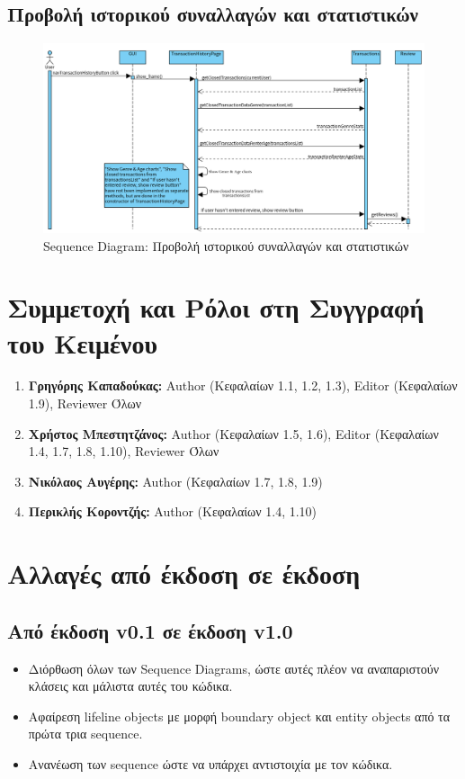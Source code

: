 \documentclass[12pt,a4paper]{article}
\begin{document}
\subsection{Προβολή ιστορικού συναλλαγών και στατιστικών}
\begin{figure}[H]
	\includegraphics[width=\textwidth]{History and Statistics Sequence.png}
	\caption{Sequence Diagram: Προβολή ιστορικού συναλλαγών και στατιστικών}
	\label{Sequence Diagram: Προβολή ιστορικού συναλλαγών και στατιστικών}
\end{figure}

\section{Συμμετοχή και Ρόλοι στη Συγγραφή του Κειμένου}
\begin{enumerate}
	\item \textbf{Γρηγόρης Καπαδούκας:} Author (Κεφαλαίων 1.1, 1.2, 1.3), Editor (Κεφαλαίων 1.9), Reviewer Όλων
	\item \textbf{Χρήστος Μπεστητζάνος:} Author (Κεφαλαίων 1.5, 1.6), Editor (Κεφαλαίων 1.4, 1.7, 1.8, 1.10), Reviewer Όλων
   	\item \textbf{Νικόλαος Αυγέρης:} Author (Κεφαλαίων 1.7, 1.8, 1.9)
	\item \textbf{Περικλής Κοροντζής:} Author (Κεφαλαίων 1.4, 1.10)
\end{enumerate}

\section{Αλλαγές από έκδοση σε έκδοση}

\subsection{Από έκδοση v0.1 σε έκδοση v1.0}
\begin{itemize}
    \item Διόρθωση όλων των Sequence Diagrams, ώστε αυτές πλέον να αναπαριστούν κλάσεις και μάλιστα αυτές του κώδικα.
    \item Αφαίρεση lifeline objects με μορφή boundary object και entity objects από τα πρώτα τρια sequence.
    \item Ανανέωση των sequence ώστε να υπάρχει αντιστοιχία με τον κώδικα.
\end{itemize}
\end{document}
